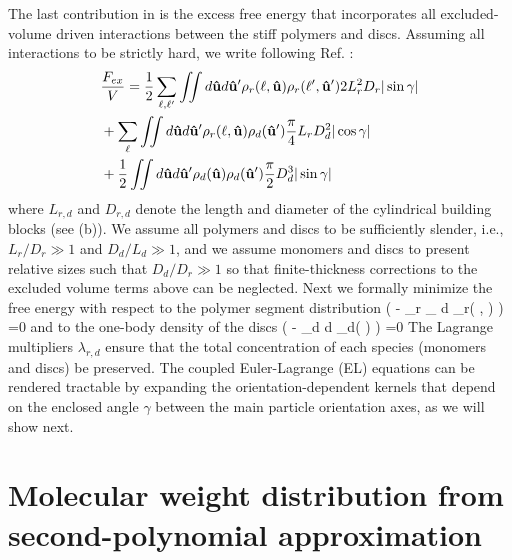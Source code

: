 The last contribution in  is the excess free energy that incorporates all excluded-volume driven interactions between the stiff polymers and discs. Assuming all interactions to be strictly hard, we write following Ref. \cite{stroobants1984}:
\begin{align}
& \frac{F_{ex}}{ V}  =  \frac{1}{2}   \sum_{\ell, \ell^{\prime}}  \iint d  {\bf \hat{u}}  d {\bf \hat{u}}^{\prime} \rho_{r}(\ell, {\bf \hat{u}})  \rho_{r}(\ell^{\prime}, {\bf \hat{u}}^{\prime})  2  L_{r}^{2} D_{r}  | \sin \gamma |  \nonumber \\
& +    \sum_{\ell}  \iint d  {\bf \hat{u}}  d {\bf \hat{u}}^{\prime} \rho_{r}(\ell, {\bf \hat{u}}) \rho_{d}( {\bf \hat{u}}^{\prime})  \frac{\pi}{4}  L_{r} D_{d}^{2}  | \cos \gamma |  \nonumber \\
& +  \frac{1}{2} \iint d  {\bf \hat{u}}  d {\bf \hat{u}}^{\prime} \rho_{d}( {\bf \hat{u}}) \rho_{d}( {\bf \hat{u}}^{\prime})  \frac{\pi}{2} D_{d}^{3}  | \sin \gamma |  
\label{fex}
\end{align}
where $L_{r,d}$ and $D_{r,d}$ denote the length and diameter of the cylindrical building blocks (see (b)).  We assume all polymers and discs to be sufficiently slender, i.e., $L_{r}/D_{r} \gg 1$ and $D_{d}/L_{d} \gg 1$, and we assume monomers and discs to present relative sizes such that $D_{d}/D_{r} \gg 1$ so that finite-thickness corrections to the excluded volume terms above can be neglected.   Next we formally minimize the free energy with respect to the polymer segment distribution
\beq
{} \left (  - \lambda_{r} \sum_{  \ell} \int d \oma \rho_{r}( \ell, \oma ) \right ) =0
\label{el1}
\eeq
and to the one-body density of the discs
\beq
{} \left (  - \lambda_{d}  \int d \oma \rho_{d}(  \oma ) \right ) =0
\label{el2}
\eeq
The Lagrange multipliers $\lambda_{r,d}$ ensure that the total concentration of each species (monomers and discs) be preserved.  The coupled Euler-Lagrange (EL) equations can be rendered tractable by expanding the orientation-dependent kernels that depend on the enclosed angle $\gamma$ between the main particle orientation axes, as we will show next.


\section[Molecular weight distribution]{Molecular weight distribution from second-polynomial approximation}

